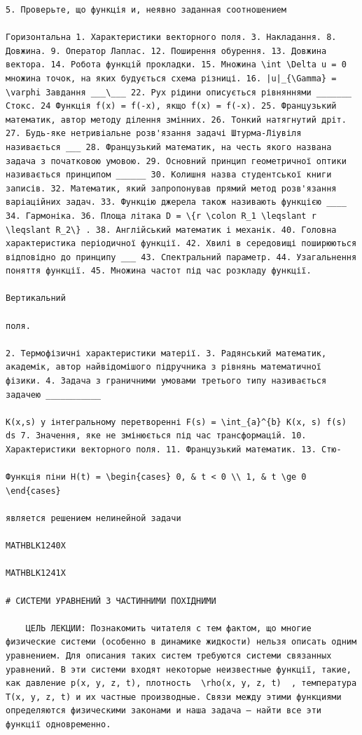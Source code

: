 \documentclass[
  ukrainian,
]{article}
\begin{document}
\begin{verbatim}
5. Проверьте, що функція и, неявно заданная соотношением

Горизонтальна 1. Характеристики векторного поля. 3. Накладання. 8. Довжина. 9. Оператор Лаплас. 12. Поширення обурення. 13. Довжина вектора. 14. Робота функцій прокладки. 15. Множина \int \Delta u = 0 множина точок, на яких будується схема різниці. 16. |u|_{\Gamma} = \varphi Завдання ___\___ 22. Рух рідини описується рівняннями _______ Стокс. 24 Функція f(x) = f(-x), якщо f(x) = f(-x). 25. Французький математик, автор методу ділення змінних. 26. Тонкий натягнутий дріт. 27. Будь-яке нетривіальне розв'язання задачі Штурма-Ліувіля називається ___ 28. Французький математик, на честь якого названа задача з початковою умовою. 29. Основний принцип геометричної оптики називається принципом ______ 30. Колишня назва студентської книги записів. 32. Математик, який запропонував прямий метод розв'язання варіаційних задач. 33. Функцію джерела також називають функцією ____ 34. Гармоніка. 36. Площа літака D = \{r \colon R_1 \leqslant r \leqslant R_2\} . 38. Англійський математик і механік. 40. Головна характеристика періодичної функції. 42. Хвилі в середовищі поширюються відповідно до принципу ___ 43. Спектральний параметр. 44. Узагальнення поняття функції. 45. Множина частот під час розкладу функції.

Вертикальний

поля.

2. Термофізичні характеристики матерії. 3. Радянський математик, академік, автор найвідомішого підручника з рівнянь математичної фізики. 4. Задача з граничними умовами третього типу називається задачею ___________

K(x,s) у інтегральному перетворенні F(s) = \int_{a}^{b} K(x, s) f(s) ds 7. Значення, яке не змінюється під час трансформацій. 10. Характеристики векторного поля. 11. Французький математик. 13. Стю-

Функція піни H(t) = \begin{cases} 0, & t < 0 \\ 1, & t \ge 0 \end{cases}

является решением нелинейной задачи

MATHBLK1240X

MATHBLK1241X

# СИСТЕМИ УРАВНЕНИЙ З ЧАСТИННИМИ ПОХІДНИМИ

    ЦЕЛЬ ЛЕКЦИИ: Познакомить читателя с тем фактом, що многие физические системи (особенно в динамике жидкости) нельзя описать одним уравнением. Для описания таких систем требуются системи связанных уравнений. В эти системи входят некоторые неизвестные функції, такие, как давление p(x, y, z, t), плотность  \rho(x, y, z, t)  , температура T(x, y, z, t) и их частные производные. Связи между этими функциями определяются физическими законами и наша задача — найти все эти функції одновременно.


\end{verbatim}
\end{document}
